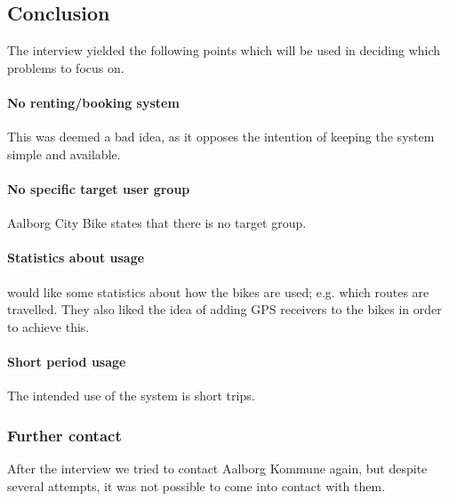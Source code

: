 \subsection{Conclusion}
The interview yielded the following points which will be used in deciding which problems to focus on.

\paragraph{No renting/booking system}
This was deemed a bad idea, as it opposes the intention of keeping the system simple and available.

\paragraph{No specific target user group}
Aalborg City Bike states that there is no target group.

\paragraph{Statistics about usage}
\citybike would like some statistics about how the bikes are used; e.g. which routes are travelled.
They also liked the idea of adding GPS receivers to the bikes in order to achieve this.

\paragraph{Short period usage}
The intended use of the system is short trips.

\subsubsection{Further contact}
After the interview we tried to contact Aalborg Kommune again, but despite several attempts, it was not possible to come into contact with them.
